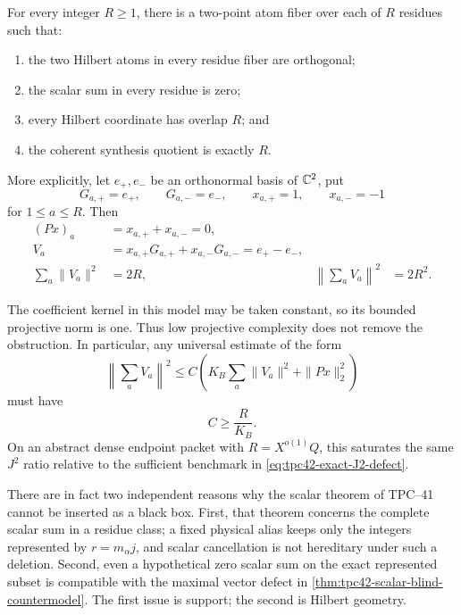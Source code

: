 \begin{theorem}
\label{thm:tpc42-scalar-blind-countermodel}
For every integer \(R\ge1\), there is a two-point atom fiber over each of
\(R\) residues such that:
\begin{enumerate}[label=(\roman*)]
 \item the two Hilbert atoms in every residue fiber are orthogonal;
 \item the scalar sum in every residue is zero;
 \item every Hilbert coordinate has overlap \(R\); and
 \item the coherent synthesis quotient is exactly \(R\).
\end{enumerate}
More explicitly, let \(e_+,e_-\) be an orthonormal basis of \(\mathbb C^2\),
put
\begin{equation}
 G_{a,+}=e_+,
 \qquad
 G_{a,-}=e_-,
 \qquad
 x_{a,+}=1,
 \qquad
 x_{a,-}=-1
 \label{eq:tpc42-countermodel-atoms}
\end{equation}
for \(1\le a\le R\).  Then
\begin{align}
 (Px)_a&=x_{a,+}+x_{a,-}=0,
 \label{eq:tpc42-countermodel-scalar-zero}\\
 V_a&=x_{a,+}G_{a,+}+x_{a,-}G_{a,-}=e_+-e_-,
 \label{eq:tpc42-countermodel-packets}\\
 \sum_a\|V_a\|^2&=2R,
 &
 \left\|\sum_aV_a\right\|^2&=2R^2.
 \label{eq:tpc42-countermodel-sharpness}
\end{align}
\end{theorem}

The coefficient kernel in this model may be taken constant, so its
bounded projective norm is one.  Thus low projective complexity does not
remove the obstruction.  In particular, any universal estimate of the
form
\begin{equation}
 \left\|\sum_aV_a\right\|^2
 \le C\left(
 K_B\sum_a\|V_a\|^2+\|Px\|_2^2
 \right)
 \label{eq:tpc42-impossible-scalar-lift}
\end{equation}
must have
\begin{equation}
 C\ge\frac R{K_B}.
 \label{eq:tpc42-countermodel-lower-bound}
\end{equation}
On an abstract dense endpoint packet with \(R=X^{o(1)}Q\), this saturates
the same \(J^2\) ratio relative to the sufficient benchmark in
\eqref{eq:tpc42-exact-J2-defect}.

There are in fact two independent reasons why the scalar theorem of
TPC--41 cannot be inserted as a black box.  First, that theorem concerns
the complete scalar sum in a residue class; a fixed physical alias keeps
only the integers represented by \(r=m_\alpha j\), and scalar cancellation
is not hereditary under such a deletion.  Second, even a hypothetical
zero scalar sum on the exact represented subset is compatible with the
maximal vector defect in
\cref{thm:tpc42-scalar-blind-countermodel}.  The first issue is support;
the second is Hilbert geometry.

